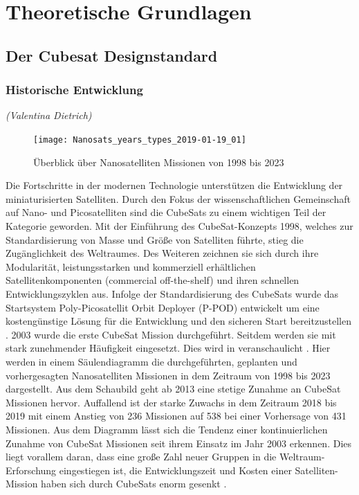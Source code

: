 \chapter{Theoretische Grundlagen}\label{theorie}
\section{Der Cubesat Designstandard}%
	\subsection{Historische Entwicklung}
	\hfill\emph{(Valentina Dietrich)}\\
				\begin{figure}[H]
				\centering
					\texttt{[image: Nanosats\_years\_types\_2019-01-19\_01]}
				\caption{Überblick über Nanosatelliten Missionen von 1998 bis 2023 \cite{ErikKulu.2014}}
				\label{fig:NanosatsTypes}
			\end{figure}		
Die Fortschritte in der modernen Technologie unterstützen die Entwicklung der miniaturisierten Satelliten. Durch den Fokus der wissenschaftlichen Gemeinschaft auf Nano- und Picosatelliten sind die CubeSats zu einem wichtigen Teil der Kategorie geworden. Mit der Einführung des CubeSat-Konzepts 1998, welches zur Standardisierung von Masse und Größe von Satelliten führte, stieg die Zugänglichkeit des Weltraumes. Des Weiteren zeichnen sie sich durch ihre Modularität, leistungsstarken und kommerziell erhältlichen Satellitenkomponenten (commercial off-the-shelf) und ihren schnellen Entwicklungszyklen aus. Infolge der Standardisierung des CubeSats wurde das Startsystem Poly-Picosatellit Orbit Deployer (P-POD) entwickelt um eine kostengünstige Lösung für die Entwicklung und den sicheren Start bereitzustellen \cite[S. 1 - 4]{RahmatSamii.2017}. 2003 wurde die erste CubeSat Mission durchgeführt. Seitdem werden sie mit stark zunehmender Häufigkeit eingesetzt. Dies wird in  veranschaulicht \cite[S. 1]{firstone}.  Hier werden in einem Säulendiagramm die durchgeführten, geplanten und vorhergesagten Nanosatelliten Missionen in dem Zeitraum von 1998 bis 2023 dargestellt. Aus dem Schaubild geht ab 2013 eine stetige Zunahme an CubeSat Missionen hervor. Auffallend ist der starke Zuwachs in dem Zeitraum 2018 bis 2019 mit einem Anstieg von  \num{236} Missionen auf \num{538} bei einer Vorhersage von \num{431} Missionen. Aus dem Diagramm lässt sich die Tendenz einer kontinuierlichen Zunahme von CubeSat Missionen seit ihrem Einsatz im Jahr 2003 erkennen. Dies liegt vorallem daran, dass eine große Zahl neuer Gruppen in die Weltraum-Erforschung eingestiegen ist, die Entwicklungszeit und Kosten einer Satelliten-Mission haben sich durch CubeSats enorm gesenkt \cite[S. 1 - 4]{RahmatSamii.2017}.
	
